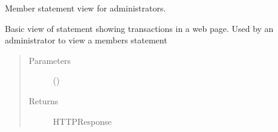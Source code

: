 \documentclass[letterpaper,10pt,english]{sphinxmanual}
\begin{document}
\begin{fulllineitems}
\label{\detokenize{payments:payments.views.statement_admin_view}}
Member statement view for administrators.

Basic view of statement showing transactions in a web page. Used by an
administrator to view a members statement
\begin{quote}\begin{description}
\item[{Parameters}] \leavevmode
{} () \textendash{} 

\item[{Returns}] \leavevmode
HTTPResponse

\end{description}\end{quote}

\end{fulllineitems}

\end{document}
